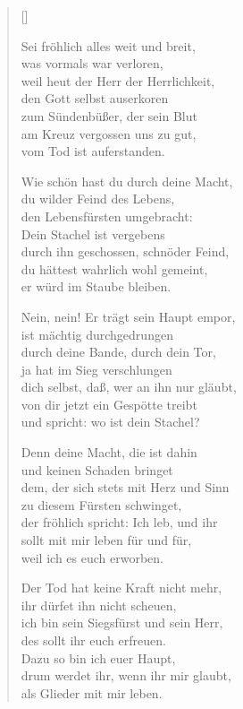 \begin{multicols}{2}
\settowidth{\versewidth}{Nein, nein! Er trägt sein Haupt empor,}
\begin{verse}[\versewidth]

 Sei fröhlich alles weit und breit,\\
was vormals war verloren,\\
weil heut der Herr der Herrlichkeit,\\
den Gott selbst auserkoren\\
zum Sündenbüßer, der sein Blut\\
am Kreuz vergossen uns zu gut,\\
vom Tod ist auferstanden.

 Wie schön hast du durch deine Macht,\\
du wilder Feind des Lebens,\\
den Lebensfürsten umgebracht:\\
Dein Stachel ist vergebens\\
durch ihn geschossen, schnöder Feind,\\
du hättest wahrlich wohl gemeint,\\
er würd im Staube bleiben.

 Nein, nein! Er trägt sein Haupt empor,\\
ist mächtig durchgedrungen\\
durch deine Bande, durch dein Tor,\\
ja hat im Sieg verschlungen\\
dich selbst, daß, wer an ihn nur gläubt,\\
von dir jetzt ein Gespötte treibt\\
und spricht: wo ist dein Stachel?

 Denn deine Macht, die ist dahin\\
und keinen Schaden bringet\\
dem, der sich stets mit Herz und Sinn\\
zu diesem Fürsten schwinget,\\
der fröhlich spricht: Ich leb, und ihr\\
sollt mit mir leben für und für,\\
weil ich es euch erworben.

 Der Tod hat keine Kraft nicht mehr,\\
ihr dürfet ihn nicht scheuen,\\
ich bin sein Siegsfürst und sein Herr,\\
des sollt ihr euch erfreuen.\\
Dazu so bin ich euer Haupt,\\
drum werdet ihr, wenn ihr mir glaubt,\\
als Glieder mit mir leben.


\end{verse}
\end{multicols}
